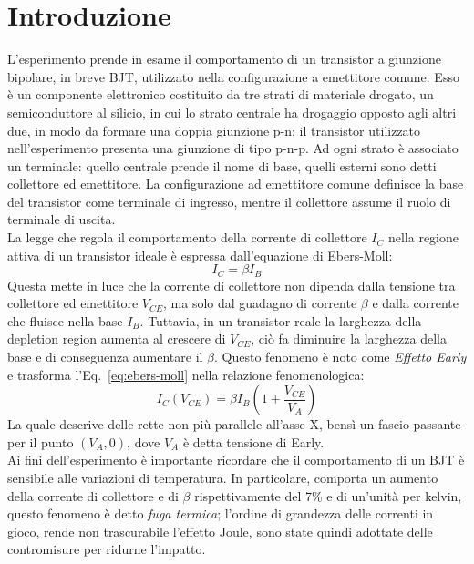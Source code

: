\documentclass[../main.tex]{subfiles}
\begin{document}
    \section{Introduzione} \label{sec:introduzione}

    L'esperimento prende in esame il comportamento di un transistor a giunzione bipolare,
    in breve BJT, utilizzato nella configurazione a emettitore comune.
    Esso è un componente elettronico costituito da tre strati di materiale drogato,
    un semiconduttore al silicio, in cui lo strato centrale ha drogaggio opposto agli
    altri due, in modo da formare una doppia giunzione p-n; il transistor
    utilizzato nell'esperimento presenta una giunzione di tipo p-n-p.
    Ad ogni strato è associato un terminale: quello centrale prende il nome di base,
    quelli esterni sono detti collettore ed emettitore.
    La configurazione ad emettitore comune definisce la base del transistor come
    terminale di ingresso, mentre il collettore assume il ruolo di terminale di uscita.\\

    La legge che regola il comportamento della corrente di
    collettore $I_C$ nella regione attiva di un transistor ideale è
    espressa dall'equazione di Ebers-Moll:
    \begin{equation}
        I_C = \beta I_B
        \label{eq:ebers-moll}
    \end{equation}
    Questa mette in luce che la corrente di collettore non dipenda
    dalla tensione tra collettore ed emettitore $V_{CE}$, ma solo
    dal guadagno di corrente $\beta$ e dalla corrente che fluisce
    nella base $I_B$.
    Tuttavia, in un transistor reale la larghezza della depletion
    region aumenta al crescere di $V_{CE}$, ciò fa diminuire la
    larghezza della base e di conseguenza aumentare il $\beta$.
    Questo fenomeno è noto come \textit{Effetto Early} e trasforma
    l'Eq.~\eqref{eq:ebers-moll} nella relazione fenomenologica:
    \begin{equation}
        I_C(V_{CE}) = \beta I_B \left( 1 + \frac{V_{CE}}{V_A} \right)
        \label{eq:early}
    \end{equation}
    La quale descrive delle rette non più parallele all'asse X,
    bensì un fascio passante per il punto $(V_A, 0)$, dove $V_A$
    è detta tensione di Early.\\

    Ai fini dell'esperimento è importante ricordare che il
    comportamento di un BJT è sensibile alle variazioni di
    temperatura.
    In particolare, comporta un aumento della corrente di collettore
    e di $\beta$ rispettivamente del 7\% e di un'unità per kelvin,
    questo fenomeno è detto \textit{fuga termica}; l'ordine di
    grandezza delle correnti in gioco, rende non trascurabile
    l'effetto Joule, sono state quindi adottate delle contromisure
    per ridurne l'impatto.\\
\end{document}

